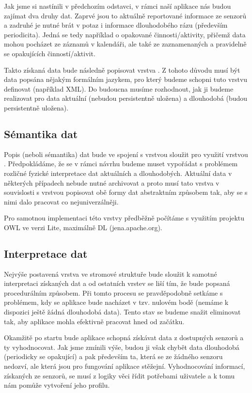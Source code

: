\documentclass[thesis=M,czech]{FITthesis}[2012/06/26]
\begin{document}
Jak jsme si nastínili v předchozím odstavci, v rámci naší aplikace nás budou zajímat dva druhy dat. Zaprvé jsou to aktuálně reportované informace ze senzorů a zadruhé je nutné brát v potaz i informace dlouhodobého rázu (především periodicita). Jedná se tedy například o opakované činnosti/aktivity, přičemž data mohou pocházet ze záznamů v kalendáři, ale také ze zaznamenaných a pravidelně se opakujících činností/aktivit.

Takto získaná data bude následně popisovat vrstva . Z tohoto důvodu musí být data popsána nějakým formálním jazykem, pro který budeme schopni tuto vrstvu definovat (například XML). Do budoucna musíme rozhodnout, jak ji budeme realizovat pro data aktuální (nebudou persistentně uložena) a dlouhodobá (budou persistentně uložena).

\subsection{Sémantika dat}
Popis (neboli sémantika) dat bude ve spojení s vrstvou  sloužit pro využití vrstvou . Předpokládáme, že se v rámci návrhu budeme muset vypořádat s problémem rozličné fyzické interpretace dat aktuálních a dlouhodobých. Aktuální data v některých případech nebude nutné archivovat a proto musí tato vrstva v souvislosti s vrstvou  popisovat obě formy dat abstraktním způsobem tak, aby se s nimi dalo pracovat co nejuniverzálněji.

Pro samotnou implementaci této vrstvy předběžně počítáme s využitím projektu OWL ve verzi Lite, maximálně DL (jena.apache.org).

\subsection{Interpretace dat}
Nejvýše postavená vrstva ve stromové struktuře bude sloužit k samotné interpretaci získaných dat a od ostatních vrstev se liší tím, že bude popsaná procedurálním způsobem. Při tomto procesu se pravděpodobně setkáme s problémem, kdy se aplikace bude nacházet v tzv. nulovém bodě (nemáme k dispozici ještě žádná dlouhodobá data). Tento stav se budeme snažit eliminovat tak, aby aplikace mohla efektivně pracovat hned od začátku.

Okamžitě po startu bude aplikace schopná získávat data z dostupných senzorů a ty vyhodnocovat. Jak jsme zmínili výše, budou ji však chybět data dlouhodobá (periodicky se opakující) a pak především ta, která se ze žádného senzoru nedozví, ale která jsou pro fungování aplikace stěžejní. Vyhodnocování informací, získaných ze senzorů, se musí z logiky věci řídit potřebami uživatele a k tomu nám pomůže vytvoření jeho profilu.
\end{document}
